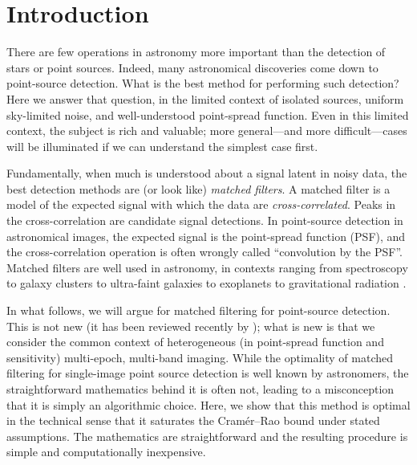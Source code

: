 \documentclass[11pt,letterpaper,linenumbers]{aastex63}
\begin{document}
\section{Introduction}

There are few operations in astronomy more important than the
detection of stars or point sources.
Indeed, many astronomical discoveries come down to point-source
detection.
What is the best method for performing such detection?
Here we answer that question, in the limited context of isolated
sources, uniform sky-limited noise, and well-understood point-spread
function.
Even in this limited context, the subject is rich and valuable; more
general---and more difficult---cases will be illuminated if we can
understand the simplest case first.

Fundamentally, when much is understood about a signal latent in noisy
data, the best detection methods are (or look like) \emph{matched
filters}.
A matched filter is a model of the expected signal with which the data
are \emph{cross-correlated}. %
Peaks in the cross-correlation are candidate signal detections.
In point-source detection in astronomical images, the expected signal is the
point-spread function (PSF), and the cross-correlation operation is often
wrongly called ``convolution by the PSF''.
Matched filters are well used in astronomy, in contexts ranging from
spectroscopy \citep{bossspectro} to
galaxy clusters \citep{redmapper, melin} to
ultra-faint galaxies \citep{willman1} to
exoplanets \citep{exoplanet} to
gravitational radiation \citep{ligo}.


In what follows, we will argue for matched filtering for point-source
detection.  This is not new (it has been reviewed recently by
\cite{zackay1}); what is new is that we consider the common context of
heterogeneous (in point-spread function and sensitivity) multi-epoch,
multi-band imaging.
%
While the optimality of matched filtering for single-image point
source detection is well known by astronomers, the straightforward
mathematics behind it is often not, leading to a misconception that it
is simply an algorithmic choice.  Here, we show that this method is
optimal in the technical sense that it saturates the Cram\'er--Rao
bound under stated assumptions.  The mathematics are straightforward
and the resulting procedure is simple and computationally inexpensive.
\end{document}
